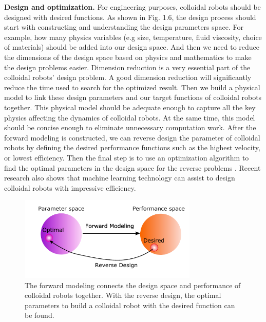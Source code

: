 \textbf{Design and optimization.} For engineering purposes, colloidal robots should be designed with desired functions\autocite{liebchen2019optimal}. As shown in Fig. 1.6, the design process should start with constructing and understanding the design parameters space. For example, how many physics variables (e.g size, temperature, fluid viscosity, choice of materials) should be added into our design space. And then we  need to reduce the dimensions of the design space based on physics and mathematics to make the design problems easier. Dimension reduction is a very essential part of the colloidal robots' design problem. A good dimension reduction will significantly reduce the time used to search for the optimized result. Then we build a physical model to link these design parameters and our target functions of colloidal robots together. This physical model should be adequate enough  to capture all the key physics affecting the dynamics of colloidal robots. At the same time, this model should be concise enough to eliminate unnecessary computation work. After the forward modeling is constructed, we can reverse design the parameter of colloidal robots by defining the desired performance functions such as the highest velocity, or lowest efficiency. Then the final step is to use an optimization algorithm to find the optimal parameters in the design space for the reverse problems \autocite{ward1963hierarchical,nocedal2006numerical}. Recent research also shows that machine learning technology can assist to design colloidal robots with impressive efficiency\autocite{yang2020micro,yang2020cargo,yang2019deep,tsang2018self}.
\begin{figure}
\centering
\includegraphics[width=8.5cm]{figures/1_6.pdf}
\caption{The forward modeling connects the design space and performance of colloidal robots together. With the reverse design, the optimal parameters to build a colloidal robot with the desired function can be found.}
\label{fig:1.6}
\end{figure}


